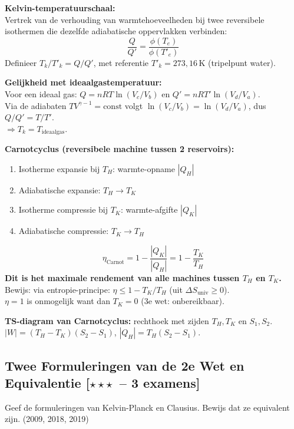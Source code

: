 \documentclass[10pt,a4paper]{article}
\begin{document}
\begin{oplossing}
\textbf{Kelvin-temperatuurschaal:}\\
Vertrek van de verhouding van warmtehoeveelheden bij twee reversibele isothermen die dezelfde adiabatische oppervlakken verbinden:
$$\frac{Q}{Q'} = \frac{\phi(T_e)}{\phi(T'_e)}$$
Definieer $T_k / T'_k = Q/Q'$, met referentie $T'_k = 273{,}16\,\text{K}$ (tripelpunt water).

\textbf{Gelijkheid met ideaalgastemperatuur:}\\
Voor een ideaal gas: $Q = nRT\ln(V_c/V_b)$ en $Q' = nRT'\ln(V_d/V_a)$.\\
Via de adiabaten $TV^{\gamma-1}=\text{const}$ volgt $\ln(V_c/V_b) = \ln(V_d/V_a)$, dus $Q/Q' = T/T'$.\\
$\Rightarrow T_k = T_{\text{ideaalgas}}$.

\textbf{Carnotcyclus (reversibele machine tussen 2 reservoirs):}
\begin{enumerate}
  \item Isotherme expansie bij $T_H$: warmte-opname $|Q_H|$
  \item Adiabatische expansie: $T_H \to T_K$
  \item Isotherme compressie bij $T_K$: warmte-afgifte $|Q_K|$
  \item Adiabatische compressie: $T_K \to T_H$
\end{enumerate}
$$\eta_\text{Carnot} = 1 - \frac{|Q_K|}{|Q_H|} = 1 - \frac{T_K}{T_H}$$
\textbf{Dit is het maximale rendement van alle machines tussen $T_H$ en $T_K$.}\\
Bewijs: via entropie-principe: $\eta \leq 1 - T_K/T_H$ (uit $\Delta S_\text{univ} \geq 0$).\\
$\eta = 1$ is onmogelijk want dan $T_K = 0$ (3e wet: onbereikbaar).

\textbf{TS-diagram van Carnotcyclus:} rechthoek met zijden $T_H, T_K$ en $S_1, S_2$.\\
$|W| = (T_H - T_K)(S_2 - S_1)$,\; $|Q_H| = T_H(S_2-S_1)$.
\end{oplossing}

\subsection{Twee Formuleringen van de 2e Wet en Equivalentie \textnormal{\color{warningred}[$\star\star\star$\ -- 3 examens]}}

\begin{theorievraag}{Geef de formuleringen van Kelvin-Planck en Clausius. Bewijs dat ze equivalent zijn. \textnormal{(2009, 2018, 2019)}}
\end{theorievraag}
\end{document}
